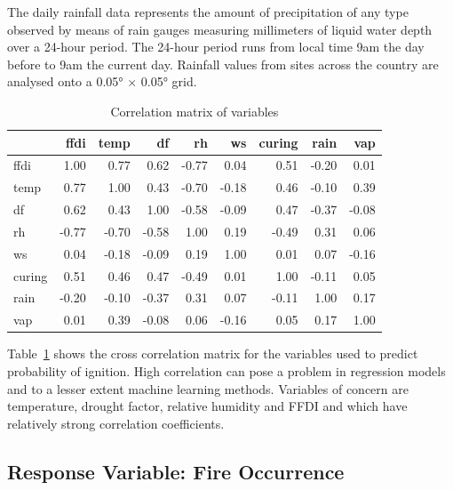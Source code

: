 \documentclass[11pt,a4paper]{article}
\begin{document}
The daily rainfall data represents the amount of precipitation of any type observed by means of rain gauges measuring millimeters of liquid water depth over a 24-hour period. The 24-hour period runs from local time 9am the day before to 9am the current day. Rainfall values from sites across the country are analysed onto a 0.05° × 0.05° grid.

\begin{table}
  \centering
  \begin{tabular}{lrrrrrrrr}
    \toprule
           & ffdi  & temp  & df    & rh    & ws    & curing & rain  & vap \\
    \midrule
    ffdi   & 1.00  & 0.77  & 0.62  & -0.77 & 0.04  & 0.51   & -0.20 & 0.01 \\
    temp   & 0.77  & 1.00  & 0.43  & -0.70 & -0.18 & 0.46   & -0.10 & 0.39 \\
    df     & 0.62  & 0.43  & 1.00  & -0.58 & -0.09 & 0.47   & -0.37 & -0.08 \\
    rh     & -0.77 & -0.70 & -0.58 & 1.00  & 0.19  & -0.49  & 0.31  & 0.06 \\
    ws     & 0.04  & -0.18 & -0.09 & 0.19  & 1.00  & 0.01   & 0.07  & -0.16 \\
    curing & 0.51  & 0.46  & 0.47  & -0.49 & 0.01  & 1.00   & -0.11 & 0.05 \\
    rain   & -0.20 & -0.10 & -0.37 & 0.31  & 0.07  & -0.11  & 1.00  & 0.17 \\
    vap    & 0.01  & 0.39  & -0.08 & 0.06  & -0.16 & 0.05   & 0.17  & 1.00 \\
    \bottomrule
  \end{tabular}
  \caption{Correlation matrix of variables}
  \label{table:correl}
\end{table}

Table~\ref{table:correl} shows the cross correlation matrix for the variables used to predict probability of ignition. High correlation can pose a problem in regression models and to a lesser extent machine learning methods. Variables of concern are temperature, drought factor, relative humidity and FFDI and  which have relatively strong correlation coefficients.

\subsection{Response Variable: Fire Occurrence}
\end{document}
